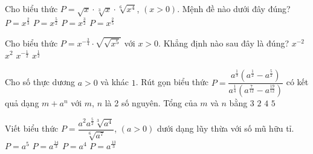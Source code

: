 \begin{ex}%
	Cho biểu thức $P=\sqrt x \cdot \sqrt[3]{x}\cdot\sqrt[6]{x^4}$, $\left(x > 0\right)$. Mệnh đề nào dưới  đây đúng?
	 \choice
		 {$P=x^{\tfrac{2}{3}}$}
		 {$P=x^{\tfrac{5}{2}}$}
		{\True $P=x^{\tfrac{3}{2}}$} 
		{$P=x^{\tfrac{2}{5}}$} 
\end{ex}

\begin{ex}%
	Cho biểu thức $P=x^{-\tfrac{3}{4}}\cdot\sqrt{\sqrt{x^5}}$ với $x>0$. Khẳng định nào sau đây là  đúng?
	\choice 
		{$x^{-2}$} 
		 {$x^2$}
		 {$x^{-\tfrac{1}{2}}$}
		{\True  $x^{\tfrac{1}{2}}$}
\end{ex}

\begin{ex}%
	Cho số thực dương $ a>0$ và khác $1$. Rút gọn biểu thức $P=\dfrac{a^{\frac{1}{3}}\left(a^{\frac{1}{2}} - a^{\frac{5}{2}}\right)}{a^{\frac{1}{4}}\left(a^{\frac{7}{12}} - a^{\frac{19}{12}}\right)}$ có kết quả dạng $ m+{a^n}$ với $ m$, $ n$ là 2 số nguyên. Tổng của $ m$ và $  n$ bằng
	 \choice
		 {$3$}
		{\True $2$} 
		 {$4$}
		 {$ 5$}
\end{ex}

\begin{ex}%
	Viết biểu thức $P=\dfrac{a^2a^{\tfrac{5}{2}}\sqrt[3]{a^4}}{\sqrt[6]{a^7}}$, $\left(a > 0\right)$ dưới dạng lũy thừa với số  mũ hữu tỉ.
	\choice 
		{$P=a^5$} 
		{\True $P=a^{\tfrac{14}{3}}$} 
		{$P=a^4$} 
		 {$P=a^{\tfrac{13}{3}}$}
\end{ex}

